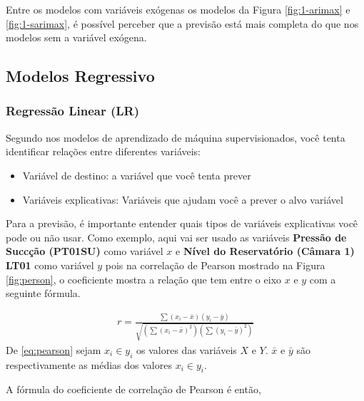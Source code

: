 Entre os modelos com variáveis exógenas os modelos da Figura \ref{fig:1-arimax} e \ref{fig:1-sarimax}, é possível perceber que a previsão está mais completa do que nos modelos sem a variável exógena.

\subsection{Modelos Regressivo}\label{subsec:reg}

\subsubsection{Regress\~ao Linear (LR)}

Segundo  nos modelos de aprendizado de máquina supervisionados, você tenta identificar relações entre diferentes variáveis:

\begin{itemize}
	\item Variável de destino: a variável que você tenta prever
	\item Variáveis explicativas: Variáveis que ajudam você a prever o alvo variável
\end{itemize}

Para a previsão, é importante entender quais tipos de variáveis explicativas você pode ou não usar. Como exemplo, aqui vai ser usado as variáveis \textbf{Pressão de Succção (PT01SU)} como variável $x$ e \textbf{Nível do Reservatório (Câmara 1) LT01} como variável $y$ pois na correlação de Pearson mostrado na Figura \ref{fig:person}, o coeficiente mostra a relação que tem entre o eixo $x$ e $y$ com a seguinte fórmula.



\begin{eqnarray}
	r=\frac{\sum\left(x_i-\bar{x}\right)\left(y_i-\bar{y}\right)}{\sqrt{\left(\sum\left(x_i-\bar{x}\right)^2\right)\left(\sum\left(y_i-\bar{y}\right)^2\right)}}\label{eq:pearson}
\end{eqnarray}
De \eqref{eq:pearson} sejam $x_i \in y_i$ os valores das variáveis $X$ e $Y$.  $\bar{x}$ e $\bar{y}$ são respectivamente as médias dos valores $x_i \in y_i$.

A fórmula do coeficiente de correlação de Pearson é então,

